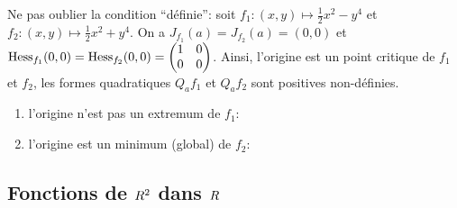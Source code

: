 \sld{\vfill\pagebreak[5]}%
\begin{remark}
	Ne pas oublier la condition ``définie'': soit $f_1:(x,y) \mapsto \frac 1 2 x^2 - y^4$ et $f_2:(x,y) \mapsto \frac 1 2 x^2 + y^4$. On a $J_{f_1} (a) = J_{f_2} (a) = (0,0)$ et $\operatorname{Hess}_{f_1}(0,0)=\operatorname{Hess}_{f_2}(0,0)= \begin{pmatrix}
		1 & 0 \\ 0 & 0
	\end{pmatrix}$. Ainsi, l'origine est un point critique de $f_1$ et $f_2$, les formes quadratiques $Q_a f_1$ et $Q_a f_2$ sont positives non-définies. 

	\begin{enumerate}
		\item  l'origine n'est pas un extremum de $f_1$: 
			\begin{center}
				\tikzexternalenable%
				\end{center}
\sld{\vfill\pagebreak[5]}%
		\item  l'origine est un minimum (global) de $f_2$: 
			\begin{center}
			  \end{center}
	\end{enumerate}
\end{remark}


\sld{\vfill\pagebreak[5]}%
\subsection{Fonctions de $R^2$ dans $R$}

